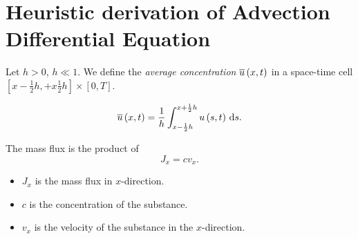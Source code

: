 \section{Heuristic derivation of Advection Differential Equation}

\begin{frame}
    \begin{definition}
        Let $h>0$, $h\ll 1$.
        We define the \emph{average concentration}
        \begin{math}
            \overline{u}\left(x,t\right)
        \end{math}
        in a space-time cell
        \begin{math}
            \left[
                x-\frac{1}{2}h,
                +x\frac{1}{2}h
                \right]
            \times
            \left[
                0,T
                \right]
        \end{math}.

        \begin{equation*}
            \averageconcentration=
            \dfrac{1}{h}
            \int_{x-\frac{1}{2}h}^{x+\frac{1}{2}h}
            u
            \left(
            s,t
            \right)
            \dl s.
        \end{equation*}
    \end{definition}

    \begin{definition}
        The mass flux is the product of
        \begin{equation*}
            J_{x}=
            c
            v_{x}.
        \end{equation*}

        \begin{itemize}
            \item

                  $J_{x}$ is the mass flux in $x$-direction.

            \item

                  $c$ is the concentration of the substance.

            \item

                  $v_{x}$ is the velocity of the substance in the
                  $x$-direction.
        \end{itemize}
    \end{definition}


\end{frame}
